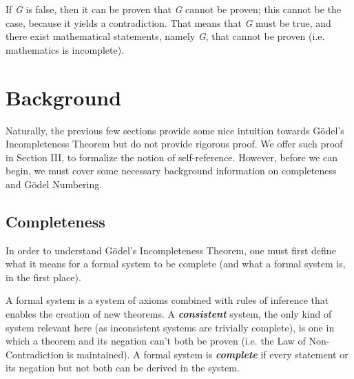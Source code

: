 \documentclass[conference]{IEEEtran}
\begin{document}
If \textit{G} is false, then it can be proven that \textit{G} cannot be proven; this cannot be the case, because it yields a contradiction. That means that \textit{G} must be true, and there exist mathematical statements, namely \textit{G}, that cannot be proven (i.e. mathematics is incomplete). 

\section{Background}
Naturally, the previous few sections provide some nice intuition towards Gödel's Incompleteness Theorem but do not provide rigorous proof. We offer such proof in Section III, to formalize the notion of self-reference. However, before we can begin, we must cover some necessary background information on completeness and Gödel Numbering. 

\subsection{Completeness}
In order to understand Gödel's Incompleteness Theorem, one must first define what it means for a formal system to be complete (and what a formal system is, in the first place). 

A formal system is a system of axioms combined with rules of inference that enables the creation of new theorems. A \emph{\textbf{consistent}} system, the only kind of system relevant here (as inconsistent systems are trivially complete), is one in which a theorem and its negation can't both be proven (i.e. the Law of Non-Contradiction is maintained). A formal system is \emph{\textbf{complete}} if every statement or its negation but not both can be derived in the system. 
\end{document}

